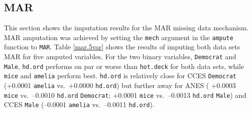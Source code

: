 \documentclass[12pt,econ]{sources/authesis}
\begin{document}
\hypertarget{ordmiss-results-mar}{%
\subsection{MAR}\label{ordmiss-results-mar}}

This section shows the imputation results for the MAR missing data mechanism. MAR amputation was achieved by setting the \texttt{mech} argument in the \texttt{ampute} function to \texttt{MAR}. Table \ref{mar.5var} shows the results of imputing both data sets MAR for five amputed variables. For the two binary variables, \texttt{Democrat} and \texttt{Male}, \texttt{hd.ord} performs on par or worse than \texttt{hot.deck} for both data sets, while \texttt{mice} and \texttt{amelia} perform best. \texttt{hd.ord} is relatively close for CCES \texttt{Democrat} (+0.0001 \texttt{amelia} vs.~+0.0000 \texttt{hd.ord}) but further away for ANES ( +0.0003 \texttt{mice} vs.~--0.0010 \texttt{hd.ord} \texttt{Democrat}; +0.0001 \texttt{mice} vs.~--0.0013 \texttt{hd.ord} \texttt{Male}) and CCES \texttt{Male} (--0.0001 \texttt{amelia} vs.~--0.0011 \texttt{hd.ord}).
\end{document}
